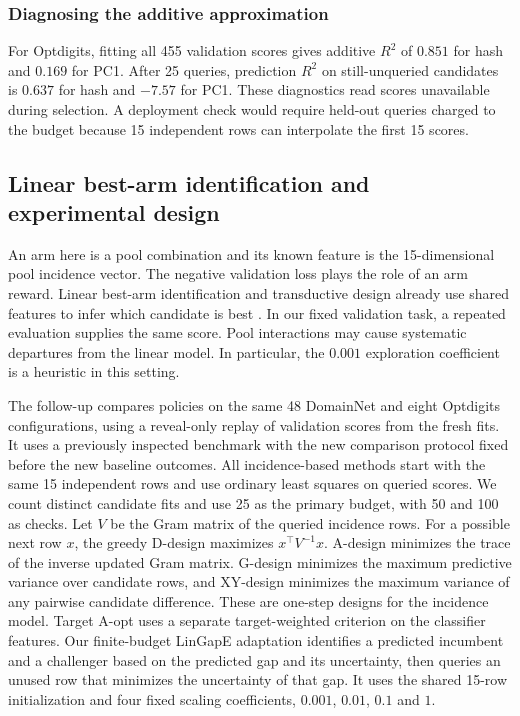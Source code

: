 \subsubsection{Diagnosing the additive approximation}
For Optdigits, fitting all 455 validation scores gives additive $R^2$ of $0.851$ for hash and $0.169$ for PC1. After 25 queries, prediction $R^2$ on still-unqueried candidates is $0.637$ for hash and $-7.57$ for PC1. These diagnostics read scores unavailable during selection. A deployment check would require held-out queries charged to the budget because 15 independent rows can interpolate the first 15 scores.

\subsection{Linear best-arm identification and experimental design}
\label{app:fresh-linear}
An arm here is a pool combination and its known feature is the 15-dimensional pool incidence vector. The negative validation loss plays the role of an arm reward. Linear best-arm identification and transductive design already use shared features to infer which candidate is best \citep{soare2014linbai,fiez2019transductive}. In our fixed validation task, a repeated evaluation supplies the same score. Pool interactions may cause systematic departures from the linear model. In particular, the $0.001$ exploration coefficient is a heuristic in this setting.

The follow-up compares policies on the same 48 DomainNet and eight Optdigits configurations, using a reveal-only replay of validation scores from the fresh fits. It uses a previously inspected benchmark with the new comparison protocol fixed before the new baseline outcomes. All incidence-based methods start with the same 15 independent rows and use ordinary least squares on queried scores. We count distinct candidate fits and use 25 as the primary budget, with 50 and 100 as checks. Let $V$ be the Gram matrix of the queried incidence rows. For a possible next row $x$, the greedy D-design maximizes $x^\top V^{-1}x$. A-design minimizes the trace of the inverse updated Gram matrix. G-design minimizes the maximum predictive variance over candidate rows, and XY-design minimizes the maximum variance of any pairwise candidate difference. These are one-step designs for the incidence model. Target A-opt uses a separate target-weighted criterion on the classifier features. Our finite-budget LinGapE adaptation \citep{xu2018lingape} identifies a predicted incumbent and a challenger based on the predicted gap and its uncertainty, then queries an unused row that minimizes the uncertainty of that gap. It uses the shared 15-row initialization and four fixed scaling coefficients, $0.001$, $0.01$, $0.1$ and $1$.

